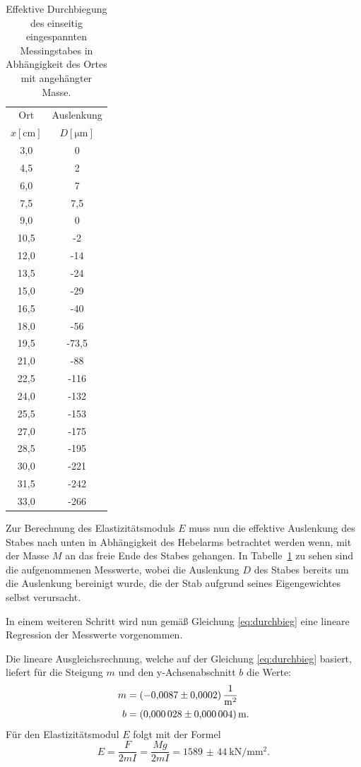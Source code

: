 \documentclass[
  bibliography=totoc,     %
  captions=tableheading,  %
  titlepage=firstiscover, %
]{scrartcl}
\begin{document}
\begin{table}[H]
    \centering
    \caption{Effektive Durchbiegung des einseitig eingespannten Messingstabes in Abhängigkeit des Ortes mit angehängter Masse.}
    \begin{tabular}{cc}
        \toprule
        {Ort} & {Auslenkung} \\
        {$x[\si{\centi\metre}]$} & {$D[\si{\micro\metre}]$} \\
        \midrule
         3,0 &    0 \\
         4,5 &    2 \\
         6,0 &    7 \\
         7,5 &  7,5 \\
         9,0 &    0 \\
        10,5 &   -2 \\
        12,0 &  -14 \\
        13,5 &  -24 \\
        15,0 &  -29 \\
        16,5 &  -40 \\
        18,0 &  -56 \\
        19,5 &-73,5 \\
        21,0 &  -88 \\
        22,5 & -116 \\
        24,0 & -132 \\
        25,5 & -153 \\
        27,0 & -175 \\
        28,5 & -195 \\
        30,0 & -221 \\
        31,5 & -242 \\
        33,0 & -266 \\
        \bottomrule
    \end{tabular}
    \label{tab2:messing}
\end{table}
Zur Berechnung des Elastizitätsmoduls $E$ muss nun die effektive Auslenkung des
Stabes nach unten in Abhängigkeit des Hebelarms betrachtet werden wenn, mit der
Masse $M$ an das freie Ende des Stabes gehangen. In Tabelle~\ref{tab2:messing}
zu sehen sind die aufgenommenen Messwerte, wobei die Auslenkung $D$ des Stabes
bereits um die Auslenkung bereinigt wurde, die der Stab aufgrund seines Eigengewichtes
selbst verursacht.

In einem weiteren Schritt wird nun gemäß Gleichung \ref{eq:durchbieg} eine
lineare Regression der Messwerte vorgenommen.

Die lineare Ausgleichsrechnung, welche auf der Gleichung \ref{eq:durchbieg}
basiert, liefert für die Steigung $m$ und den y-Achsenabschnitt $b$ die Werte:
\begin{align}
    m &= \SI{-0.0087(2)}{\frac{1}{\metre\squared}} \\
    b &= \SI{0.000028(4)}{\metre}.
\end{align}
Für den Elastizitätsmodul $E$ folgt mit der Formel
\begin{equation}
    E = \frac{F}{2mI} = \frac{Mg}{2mI} = \SI{1589(44)}{\kilo\newton\per\milli\metre\squared}.
    \label{eq:E}
\end{equation}
\end{document}
